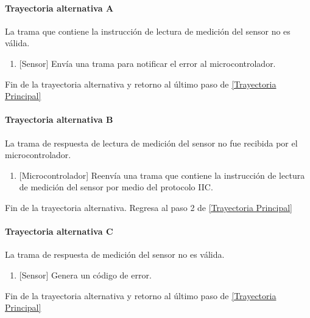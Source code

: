 \paragraph{Trayectoria alternativa A} \label{SUB-M-CU1.1:TA}
	La trama que contiene la instrucción de lectura de medición del sensor no es válida.
	\begin{enumerate}[label=A\arabic*.]
		\item {[Sensor]} Envía una trama para notificar el error al microcontrolador.  
	\end{enumerate}
	Fin de la trayectoria alternativa y retorno al último paso de \hyperref[SUB-M-CU1.1:TP]{[Trayectoria Principal]}  

\paragraph{Trayectoria alternativa B} \label{SUB-M-CU1.1:TB}
	La trama de respuesta de lectura de medición del sensor no fue recibida por el microcontrolador.
	\begin{enumerate}[label=B\arabic*.]
		\item {[Microcontrolador]} Reenvía una trama que contiene la instrucción de lectura de medición del sensor por medio del protocolo IIC.  
	\end{enumerate}
	Fin de la trayectoria alternativa. Regresa al paso 2 de \hyperref[SUB-M-CU1.1:TP]{[Trayectoria Principal]}  
	
\paragraph{Trayectoria alternativa C} \label{SUB-M-CU1.1:TC}
	La trama de respuesta de medición del sensor no es válida.
	\begin{enumerate}[label=C\arabic*.]
		\item {[Sensor]} Genera un código de error.
	\end{enumerate}
	Fin de la trayectoria alternativa y retorno al último paso de \hyperref[SUB-M-CU1.1:TP]{[Trayectoria Principal]} 